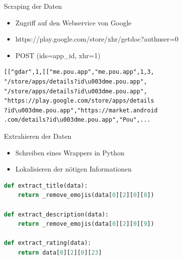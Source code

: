 \documentclass[compress,t]{beamer}
\begin{document}
\begin{frame}[fragile]{Scraping der Daten}

    \begin{itemize}
        \item Zugriff auf den Webservice von Google
        \item https://play.google.com/store/xhr/getdoc?authuser=0
        \item POST (ids=app\_id, xhr=1)
    \end{itemize}

    \begin{lstlisting}
[["gdar",1,[["me.pou.app","me.pou.app",1,3,
"/store/apps/details?id\u003dme.pou.app",
"/store/apps/details?id\u003dme.pou.app",
"https://play.google.com/store/apps/details
?id\u003dme.pou.app","https://market.android
.com/details?id\u003dme.pou.app","Pou",...
    \end{lstlisting}

\end{frame}

\begin{frame}[fragile]{Extrahieren der Daten}
    \begin{itemize}
        \item Schreiben eines Wrappers in Python
        \item Lokalisieren der nötigen Informationen
    \end{itemize}

    \begin{lstlisting}[language=Python]
def extract_title(data):
    return _remove_emojis(data[0][2][0][8])

def extract_description(data):
    return _remove_emojis(data[0][2][0][9])

def extract_rating(data):
    return data[0][2][0][23]
    \end{lstlisting}

\end{frame}

\end{document}
